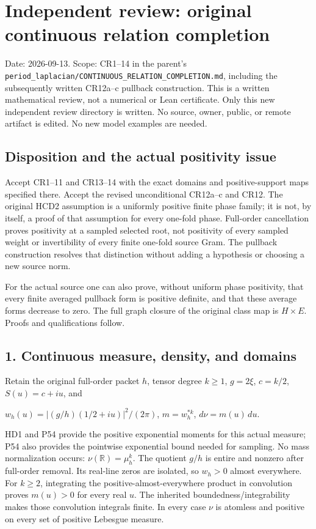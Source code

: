 \section{Independent review: original continuous relation completion}\label{independent-review-original-continuous-relation-completion}

Date: 2026-09-13. Scope: CR1--14 in the parent's \nolinkurl{period_laplacian/CONTINUOUS_RELATION_COMPLETION.md}, including the subsequently written CR12a--c pullback construction. This is a written mathematical review, not a numerical or Lean certificate. Only this new independent review directory is written. No source, owner, public, or remote artifact is edited. No new model examples are needed.

\subsection{Disposition and the actual positivity issue}\label{disposition-and-the-actual-positivity-issue}

Accept CR1--11 and CR13--14 with the exact domains and positive-support maps specified there. Accept the revised unconditional CR12a--c and CR12. The original HCD2 assumption is a uniformly positive finite phase family; it is not, by itself, a proof of that assumption for every one-fold phase. Full-order cancellation proves positivity at a sampled selected root, not positivity of every sampled weight or invertibility of every finite one-fold source Gram. The pullback construction resolves that distinction without adding a hypothesis or choosing a new source norm.

For the actual source one can also prove, without uniform phase positivity, that every finite averaged pullback form is positive definite, and that these average forms decrease to zero. The full graph closure of the original class map is \(H\times E\). Proofs and qualifications follow.

\subsection{1. Continuous measure, density, and domains}\label{continuous-measure-density-and-domains}

Retain the original full-order packet \(h\), tensor degree \(k\ge1\), \(g=2\xi\), \(c=k/2\), \(S(u)=c+iu\), and

\(w_h(u)=|(g/h)(1/2+iu)|^2/(2\pi)\), \(m=w_h^{*k}\), \(d\nu=m(u)\,du\).

HD1 and P54 provide the positive exponential moments for this actual measure; P54 also provides the pointwise exponential bound needed for sampling. No mass normalization occurs: \(\nu(\mathbb R)=\mu_h^k\). The quotient \(g/h\) is entire and nonzero after full-order removal. Its real-line zeros are isolated, so \(w_h>0\) almost everywhere. For \(k\ge2\), integrating the positive-almost-everywhere product in convolution proves \(m(u)>0\) for every real \(u\). The inherited boundedness/integrability makes those convolution integrals finite. In every case \(\nu\) is atomless and positive on every set of positive Lebesgue measure.

